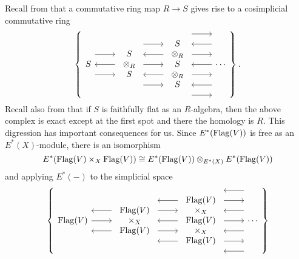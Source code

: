 Recall from  that a commutative ring map $R \rightarrow S$ gives rise to a cosimplicial commutative ring
\[\left\{
\begin{tikzcd}[ampersand replacement=\&]
S \arrow[leftarrow]{r} \arrow[shift left=\baselineskip]{r} \arrow[shift right=\baselineskip]{r} \&
\begin{array}{c} S \\ \otimes_R \\ S \end{array} \arrow[shift left=(2*\baselineskip)]{r} \arrow[leftarrow, shift left=\baselineskip]{r} \arrow{r} \arrow[leftarrow, shift right=\baselineskip]{r} \arrow[shift right=(2*\baselineskip)]{r} \&
\begin{array}{c} S \\ \otimes_R \\ S \\ \otimes_R \\ S \end{array} \arrow[shift left=(3*\baselineskip)]{r} \arrow[leftarrow, shift left=(2*\baselineskip)]{r} \arrow[shift left=\baselineskip]{r} \arrow[leftarrow]{r} \arrow[shift right=\baselineskip]{r} \arrow[leftarrow, shift right=(2*\baselineskip)]{r} \arrow[shift right=(3*\baselineskip)]{r} \&
\cdots
\end{tikzcd}
\right\}.\]
Recall also from  that if $S$ is faithfully flat as an $R$-algebra, then the above complex is exact except at the first spot and there the homology is $R$.  This digression has important consequences for us. Since $E^*(\operatorname{Flag}(V))$ is free as an $E^*(X)$-module, there is an isomorphism
\[
E^*(\operatorname{Flag}(V) \times_X \operatorname{Flag}(V)) \cong E^*(\operatorname{Flag}(V)) \otimes_{E^*(X)} E^*(\operatorname{Flag}(V))
\]
and applying $E^*(-)$ to the simplicial space
\[\left\{
\begin{tikzcd}[ampersand replacement=\&]
\Flag(V) \arrow{r} \arrow[leftarrow,shift left=\baselineskip]{r} \arrow[leftarrow,shift right=\baselineskip]{r} \&
\begin{array}{c} \Flag(V) \\ \times_X \\ \Flag(V) \end{array} \arrow[leftarrow, shift left=(2*\baselineskip)]{r} \arrow[shift left=\baselineskip]{r} \arrow[leftarrow]{r} \arrow[shift right=\baselineskip]{r} \arrow[leftarrow, shift right=(2*\baselineskip)]{r} \&
\begin{array}{c} \Flag(V) \\ \times_X \\ \Flag(V) \\ \times_X \\ \Flag(V) \end{array} \arrow[leftarrow, shift left=(3*\baselineskip)]{r} \arrow[shift left=(2*\baselineskip)]{r} \arrow[leftarrow, shift left=\baselineskip]{r} \arrow{r} \arrow[leftarrow, shift right=\baselineskip]{r} \arrow[shift right=(2*\baselineskip)]{r} \arrow[leftarrow, shift right=(3*\baselineskip)]{r} \&
\cdots
\end{tikzcd}
\right\}\]
